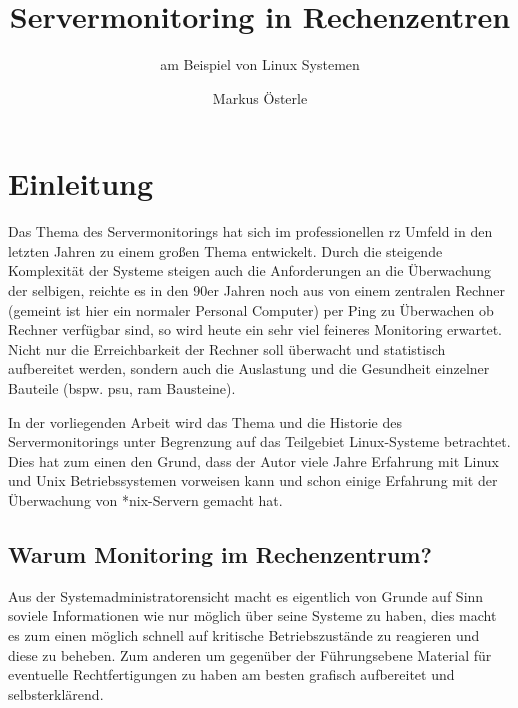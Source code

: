 \documentclass[12pt,a4paper,parskip]{scrreprt}
\begin{document}
	\subject{Seminararbeit im Studiengang \glqq Verwaltungsinformatik\grqq}
	\author{Markus Österle}
	\title{Servermonitoring in Rechenzentren}
	\subtitle{am Beispiel von Linux Systemen}
	\publishers{Betreut von Dipl. Inf. Stefan Müller}
	\date{} %

	\maketitle
	\setcounter{tocdepth}{3}
	\tableofcontents
	\onehalfspacing
	\chapter{Einleitung}
Das Thema des Servermonitorings hat sich im professionellen \acrshort{rz} Umfeld in den letzten Jahren zu einem großen Thema entwickelt. Durch die steigende Komplexität der Systeme steigen auch die Anforderungen an die Überwachung der selbigen, reichte es in den 90er Jahren noch aus von einem zentralen Rechner (gemeint ist hier ein normaler Personal Computer) per Ping zu Überwachen ob Rechner verfügbar sind, so wird heute ein sehr viel feineres Monitoring erwartet. Nicht nur die Erreichbarkeit der Rechner soll überwacht und statistisch aufbereitet werden, sondern auch die Auslastung und die Gesundheit einzelner Bauteile (bspw. \gls{psu}, \acrshort{ram} Bausteine). 

In der vorliegenden Arbeit wird das Thema und die Historie des Servermonitorings unter Begrenzung auf das Teilgebiet Linux-Systeme betrachtet. Dies hat zum einen den Grund, dass der Autor viele Jahre Erfahrung mit Linux und Unix Betriebssystemen vorweisen kann und schon einige Erfahrung mit der Überwachung von *nix-Servern gemacht hat.
	\section{Warum Monitoring im Rechenzentrum?}
	Aus der Systemadministratorensicht macht es eigentlich von Grunde auf Sinn soviele Informationen wie nur möglich über seine Systeme zu haben, dies macht es zum einen möglich schnell auf kritische Betriebszustände zu reagieren und diese zu beheben. Zum anderen um gegenüber der Führungsebene Material für eventuelle Rechtfertigungen zu haben am besten grafisch aufbereitet und selbsterklärend.
	
\end{document}

